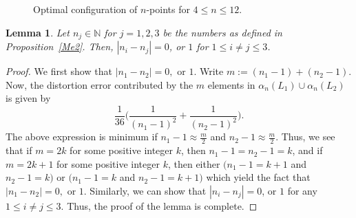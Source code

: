 \documentclass[12pt, reqno]{amsart}
\theoremstyle{plain}
\newtheorem{lemma}[subsection]{Lemma}
\theoremstyle{definition}
\newcommand{\uu}{\cup}%
\newcommand{\ga}{\alpha}
\newcommand{\D}[1]{\mathbb{#1}}%
\newcommand{\te}{\text}%
\begin{document}
\begin{figure}
 \caption{Optimal configuration of $n$-points for $4\leq n\leq 12$.} \label{Fig2}
\end{figure}







\begin{lemma} \label{lemmaMe1} 
Let $n_j\in \D N$ for $j=1, 2, 3$ be the numbers as defined in Proposition~\ref{Me2}. Then, $|n_i-n_j|=0$, or $1$ for $1\leq i\neq j\leq 3$. 
\end{lemma}

\begin{proof} We first show that $|n_1-n_2|=0, \te{ or } 1$. 
Write $m:=(n_1-1)+(n_2-1)$. Now, the distortion error contributed by the $m$ elements in $\ga_n(L_1)\uu \ga_n(L_2)$ is given by 
\[\frac{1}{36} \Big(\frac 1{(n_1-1)^2}+\frac 1{(n_2-1)^2}\Big).\]
The above expression is minimum if $n_1-1\approx \frac m 2$ and $n_2-1\approx \frac m 2$. Thus, we see that if $m=2k$ for some positive integer $k$, then $n_1-1=n_2-1=k$, and if $m=2k+1$ for some positive integer $k$, then either $(n_1-1=k+1$ and $n_2-1=k)$ or $(n_1-1=k$ and $n_2-1=k+1)$ which yield the fact that $|n_1-n_2|=0, \te{ or } 1$. Similarly, we can show that  $|n_i-n_j|=0$, or $1$ for any $1\leq i\neq j\leq 3$. Thus, the proof of the lemma is complete. 
\end{proof}  
\end{document}
